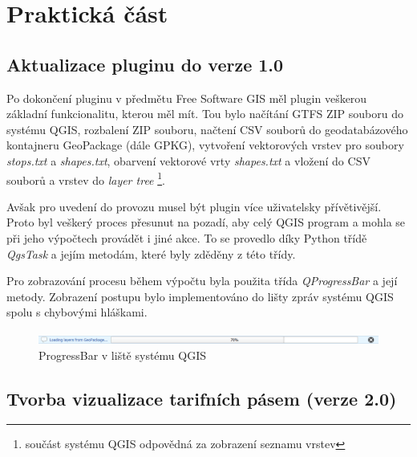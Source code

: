 \chapter{Praktická část}
\label{5-postup}

\section{Aktualizace pluginu do verze 1.0}
Po dokončení pluginu v předmětu Free Software GIS měl plugin veškerou základní
funkcionalitu, kterou měl mít. Tou bylo načítání GTFS ZIP souboru do systému QGIS,
rozbalení ZIP souboru, načtení CSV souborů do geodatabázového kontajneru GeoPackage (dále GPKG),
vytvoření vektorových vrstev pro soubory \textit{stops.txt} a \textit{shapes.txt},
obarvení vektorové vrty \textit{shapes.txt} a vložení do CSV souborů a vrstev do
\textit{layer tree} \footnote{součást systému QGIS odpovědná za zobrazení seznamu vrstev}.


Avšak pro uvedení do  provozu musel být plugin více uživatelsky přívětivější.
Proto byl veškerý proces přesunut na pozadí, aby celý QGIS program  a
mohla se při jeho výpočtech provádět i jiné akce. To se provedlo díky Python třídě \textit{QgsTask}
a jejím metodám, které byly zděděny z této třídy. \cite{QgsTask}

Pro zobrazování procesu během výpočtu byla použita třída \textit{QProgressBar} a její metody.
Zobrazení postupu bylo implementováno do lišty zpráv systému QGIS spolu s chybovými hláškami.

\begin{figure}[H] \centering
    \includegraphics[width=400pt]{./pictures/loading.png}
    \caption[ProgressBar]{ProgressBar v liště systému QGIS}
	\label{fig:ProgressBar v liště systému QGIS}              
\end{figure}     


\section{Tvorba vizualizace tarifních pásem (verze 2.0)}

